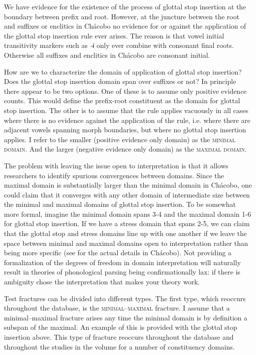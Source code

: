 \documentclass[output=paper,hidelinks]{langscibook}
\begin{document}
We have evidence for the existence of the process of glottal stop insertion at the boundary between prefix and root. However, at the juncture between the root and suffixes or enclitics in Chácobo no evidence for or against the application of the glottal stop insertion rule ever arises. The reason is that vowel initial transitivity markers such as \textit{-ɨ} only ever combine with consonant final roots. Otherwise all suffixes and enclitics in Chácobo are consonant initial.

How are we to characterize the domain of application of glottal stop insertion? Does the glottal stop insertion domain span over suffixes or not? In principle there appear to be two options. One of these is to assume only positive evidence counts. This would define the prefix-root constituent as the domain for glottal stop insertion. The other is to assume that the rule applies vacuously in all cases where there is no evidence against the application of the rule, i.e. where there are adjacent vowels spanning morph boundaries, but where no glottal stop insertion applies. I refer to the smaller (positive evidence only domain) as the \textsc{minimal domain}. And the larger (negative evidence only domain) as the \textsc{maximal domain}.

The problem with leaving the issue open to interpretation is that it allows researchers to identify spurious convergences between domains. Since the maximal domain is substantially larger than the minimal domain in Chácobo, one could claim that it converges with any other domain of intermediate size between the minimal and maximal domains of glottal stop insertion. To be somewhat more formal, imagine the minimal domain spans 3-4 and the maximal domain 1-6 for glottal stop insertion. If we have a stress domain that spans 2-5, we can claim that the glottal stop and stress domains line up with one another if we leave the space between minimal and maximal domains open to interpretation rather than being more specific (see \cite{tallman2021constituency} for the actual details in Chácobo). Not providing a formalization of the degrees of freedom in domain interpretation will naturally result in theories of phonological parsing being confirmationally lax: if there is ambiguity chose the interpretation that makes your theory work.

Test fractures can be divided into different types. The first type, which reoccurs throughout the database, is the \textsc{minimal--maximal} fracture. I assume that a minimal--maximal fracture arises any time the minimal domain is by definition a subspan of the maximal. An example of this is provided with the glottal stop insertion above. This type of fracture reoccurs throughout the database and throughout the studies in the volume for a number of constituency domains.
\end{document}
